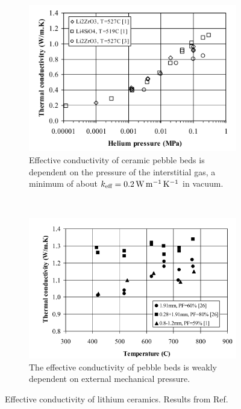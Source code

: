 \begin{figure}[ht]
        \centering
        \begin{subfigure}[t]{\doubleimagewidth}
                \includegraphics[width=\textwidth]{figures/keff-pressure}
                \caption{Effective conductivity of ceramic pebble beds is dependent on the pressure of the interstitial gas, a minimum of about $k_\text{eff} = \SI{0.2}{\watt\per\meter\per\kelvin}$ in vacuum.}
                \label{fig:keff-pressure}
        \end{subfigure}%
        ~
        \begin{subfigure}[t]{\doubleimagewidth  }
                \includegraphics[width=\textwidth]{figures/lit-keff-exp}
                \caption{The effective conductivity of pebble beds is weakly dependent on external mechanical pressure.}
                \label{fig:keff-lit}
        \end{subfigure}
        \caption{Effective conductivity of lithium ceramics. Results from Ref.~\cite{Abou-Sena2005}}\label{fig:keff}
\end{figure}

